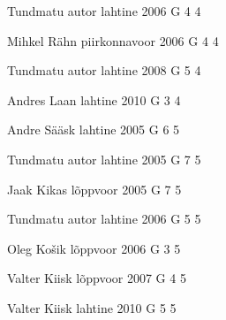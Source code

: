 \documentclass[11pt]{article}
\begin{document}
{Tundmatu autor} %
{lahtine} %
{2006} %
{G 4} %
{4} %
{

\ifEngHint
\fi
}

{Mihkel Rähn} %
{piirkonnavoor} %
{2006} %
{G 4} %
{4} %
{

\ifEngHint
\fi
}

{Tundmatu autor} %
{lahtine} %
{2008} %
{G 5} %
{4} %
{

\ifEngHint
\fi
}

{Andres Laan} %
{lahtine} %
{2010} %
{G 3} %
{4} %
{

\ifEngHint
\fi
}

{Andre Sääsk} %
{lahtine} %
{2005} %
{G 6} %
{5} %
{

\ifEngHint
\fi
}

{Tundmatu autor} %
{lahtine} %
{2005} %
{G 7} %
{5} %
{

\ifEngHint
\fi
}

{Jaak Kikas} %
{lõppvoor} %
{2005} %
{G 7} %
{5} %
{

\ifEngHint
\fi
}

{Tundmatu autor} %
{lahtine} %
{2006} %
{G 5} %
{5} %
{

\ifEngHint
\fi
}

{Oleg Košik} %
{lõppvoor} %
{2006} %
{G 3} %
{5} %
{

\ifEngHint
\fi
}

{Valter Kiisk} %
{lõppvoor} %
{2007} %
{G 4} %
{5} %
{

\ifEngHint
\fi
}

{Valter Kiisk} %
{lahtine} %
{2010} %
{G 5} %
{5} %
{

\ifEngHint
\fi
}
\end{document}
